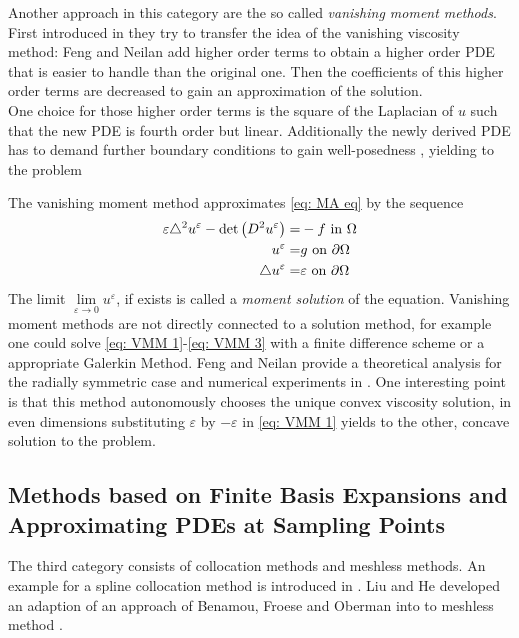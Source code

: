 Another approach in this category are the so called \emph{vanishing moment methods}. First introduced in \cite{FN2009} they try to transfer the idea of the vanishing viscosity method: Feng and Neilan add higher order terms to obtain a higher order PDE that is easier to handle than the original one. Then the coefficients of this higher order terms are decreased to gain an approximation of the \MA solution. \\
One choice for those higher order terms is the square of the Laplacian of $u$ such that the new PDE is fourth order but linear. Additionally the newly derived PDE has to demand further boundary conditions to gain well-posedness , yielding to the problem
\begin{definition}
	The vanishing moment method approximates \eqref{eq: MA eq} by the sequence
	\begin{align}
		\varepsilon \triangle^2 u^\varepsilon - \det{\left(D^2 u^\varepsilon\right)} =& -f \text{ in } \Omega \label{eq: VMM 1}\\ 
		u^\varepsilon =& g \text{ on } \partial \Omega \label{eq: VMM 2}\\
		\triangle u^\varepsilon = & \varepsilon \text{ on } \partial \Omega \label{eq: VMM 3}
	\end{align}
The limit $\lim\limits_{\varepsilon \rightarrow 0 } u^\varepsilon$, if exists is called a \emph{moment solution} of the \MA equation.
Vanishing moment methods are not directly connected to a solution method, for example one could solve \eqref{eq: VMM 1}-\eqref{eq: VMM 3} with a finite difference scheme or a appropriate Galerkin Method.
Feng and Neilan provide a theoretical analysis for the radially symmetric case and numerical experiments in \cite{FN2009, Neilan2010, FN2011a}. One interesting point is that this method autonomously chooses the unique convex viscosity solution, in even dimensions substituting $\varepsilon$ by $-\varepsilon$ in  \eqref{eq: VMM 1} yields to the other, concave solution to the \MA problem.  
\end{definition}


\subsection{Methods based on Finite Basis Expansions and Approximating PDEs at Sampling Points}
The third category consists of collocation methods and meshless methods.
An example for a spline collocation method is introduced in \cite{BHP2014}. 
Liu and He developed an adaption of an approach of Benamou, Froese and Oberman into to meshless method \cite{LH2013}.
